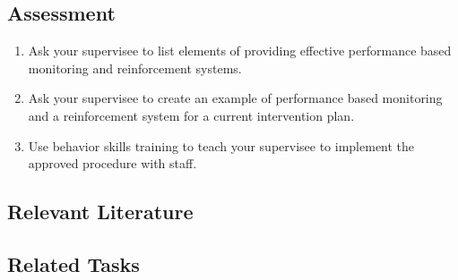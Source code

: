 \subsection{Assessment}
\begin{enumerate}
\item Ask your supervisee to list elements of providing effective performance based monitoring and reinforcement systems. 
\item Ask your supervisee to create an example of performance based monitoring and a reinforcement system for a current intervention plan.
\item Use behavior skills training to teach your supervisee to implement the approved procedure with staff. 
%
\end{enumerate}
%
\subsection{Relevant Literature}
\begin{refsection}
\nocite{test,alang2017police,clayton2018black}
\printbibliography[heading=none]
\end{refsection} 
%
\subsection{Related Tasks}
\fourdOne{}\\
\fourfOne{}\\
\fourfTwo{}\\
\fourfThree{}\\
\fourhThree{}\\
\fourhFour{}\\
\fouriOne{}\\
\fourkThree{}\\
\fourkFive{}\\
%
%
%
%
%
%
%
%
%
%
